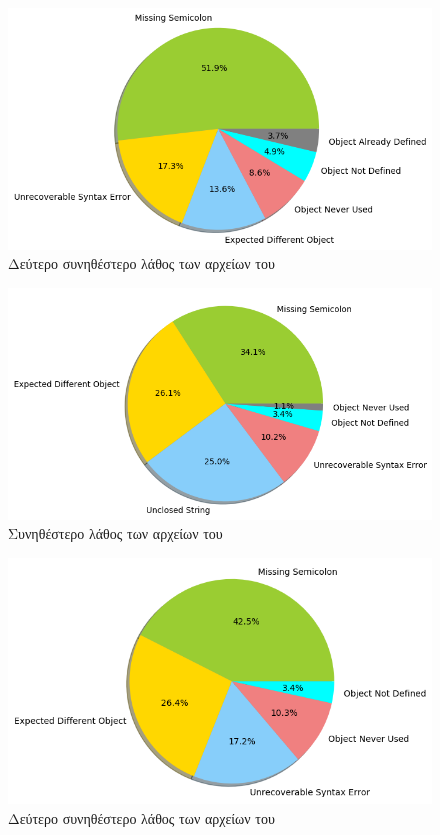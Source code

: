\begin{figure}[!htb]
	\includegraphics[width=\textwidth, keepaspectratio]{images/MCE2-githubchar.png}
	\caption{Δεύτερο συνηθέστερο λάθος των αρχείων του }
	\label{MCE2-githubchar}
\end{figure}

\begin{figure}[!htb]
	\includegraphics[width=\textwidth, keepaspectratio]{images/MCE-githubLabeled.png}
	\caption{Συνηθέστερο λάθος των αρχείων του }
	\label{MCE1-githubLabeled}
\end{figure}

\begin{figure}[!htb]
	\includegraphics[width=\textwidth, keepaspectratio]{images/MCE2-githubLabeled.png}
	\caption{Δεύτερο συνηθέστερο λάθος των αρχείων του }
	\label{MCE2-githubLabeled}
\end{figure}


